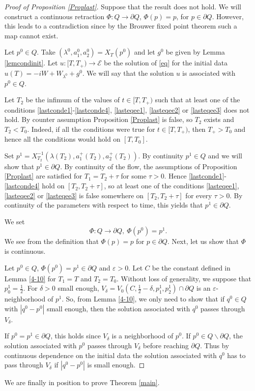 \documentclass[a4paper,two-side,10pt]{amsart}
\numberwithin{equation}{section}
\begin{document}
\begin{proof}[Proof of Proposition \ref{Proplast}]
Suppose that the result does not hold. We will construct a continuous retraction $\Phi : Q \rightarrow \partial Q$, $\Phi (p)=p$, for $p\in \partial Q$. However, this leads to a contradiction since by the Brouwer fixed point theorem %
such a map cannot exist.

Let $p^0 \in Q$. Take $(\lambda^0 , {a}_1^0 , {a}_2^0 )= X_T (p^0)$ and let $g^0$ be given by Lemma \ref{lemcondinit}. Let $u: [T,T_+) \rightarrow \mathcal{E}$ be the solution of \eqref{eq} for the initial data $u(T)=-iW +W_{\lambda^0}+g^0$. We will say that the solution $u$ is associated with $p^0 \in Q$.

Let $T_2$ be the infimum of the values of $t\in [T,T_+)$ such that at least one of the conditions \eqref{lastconde1}-\eqref{lastconde4}, \eqref{lasteqee1}, \eqref{lasteqee2} or \eqref{lasteqee3} does not hold. By counter assumption Proposition \ref{Proplast} is false, so $T_2$  exists and $T_2<T_0$. Indeed, if all the conditions were true for $t\in [T,T_+)$, then $T_+>T_0$ and hence all the conditions would hold on $[T,T_0]$.


Set $p^1 = X_{T_2}^{-1} (\lambda (T_2) , a_1^+ (T_2) ,a_2^+ (T_2))$. By continuity $p^1 \in Q$ and we will show that $p^1 \in \partial Q$. By continuity of the flow, the assumptions of Proposition \ref{Proplast} are satisfied for $T_1 =T_2  +\tau$ for some $\tau>0$. Hence \eqref{lastconde1}-\eqref{lastconde4} hold on $[T_2 , T_2 +\tau]$, so at least one of the conditions \eqref{lasteqee1}, \eqref{lasteqee2} or \eqref{lasteqee3} is false somewhere on $[T_2 , T_2+\tau]$ for every $\tau>0$. By continuity of the parameters with respect to time, this yields that $p^1 \in \partial Q$.

 We set
$$\Phi : Q \rightarrow \partial Q,\ \Phi (p^0)=p^1.$$
We see from the definition that $\Phi (p)=p$ for $p\in \partial Q$. Next, let us show that $\Phi$ is continuous. 


Let $p^0 \in Q$, $\Phi (p^0) =p^1 \in \partial Q$ and $\varepsilon >0$. Let $C$ be the constant defined in Lemma \ref{4-10} for $T_1=T$ and $T_2=T_0$. Without loss of generality, we suppose that $p_0^1 = \frac{1}{2}$. For $\delta>0$ small enough, $V_\delta = V_0 (C, \frac{1}{2}-\delta , p_1^1 ,p_2^1)\cap \partial Q$ is an $\varepsilon$-neighborhood of $p^1$. So, from Lemma \ref{4-10}, we only need to show that if $q^0 \in Q$ with $|q^0 -p^0|$ small enough, then the solution associated with $q^0$ passes through $V_\delta$.

If $p^0=p^1 \in \partial Q$, this holds since $V_\delta$ is a neighborhood of $p^0$. If $p^0 \in Q \backslash \partial Q$, the solution associated with $p^0$ passes through $V_\delta$ before reaching $\partial Q$. Thus by continuous dependence on the initial data the solution associated with $q^0$ has to pass through $V_\delta$ if $|q^0 -p^0|$ is small enough.

\end{proof}
We are finally in position to prove Theorem \ref{main}.
\end{document}
